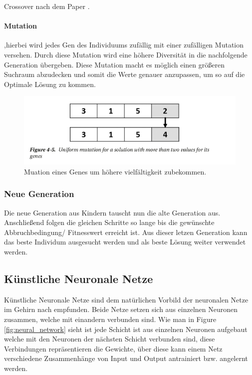 Crossover nach dem Paper \cite{Umbarkar2015}.




\paragraph{Mutation},hierbei wird jedes Gen des Individuums zufällig mit einer zufälligen Mutation versehen. Durch diese Mutation wird eine höhere Diversität in die nachfolgende Generation übergeben. Diese Mutation macht es möglich einen größeren Suchraum abzudecken und somit die Werte genauer anzupassen, um so auf die Optimale Lösung zu kommen. 

\begin{figure}[H]
  \centering  
  \includegraphics[scale=0.5]{img/mutation.png}
  \caption{Muation eines Genes um höhere vielfältigkeit zubekommen.\cite{Rashid2017} }
  \label{fig:chromoson_mutation}
\end{figure}


\subsubsection{Neue Generation}
Die neue Generation aus Kindern tauscht nun die alte Generation aus. Anschließend folgen die gleichen Schritte so lange bis die gewünschte Abbruchbedingung/ Fitnesswert erreicht ist. Aus dieser letzen Generation kann das beste Individum ausgesucht werden und als beste Lösung weiter verwendet werden. 

\newpage
\subsection{Künstliche Neuronale Netze}

Künstliche Neuronale Netze sind dem natürlichen Vorbild der neuronalen Netze im Gehirn nach empfunden. Beide Netze setzen sich aus einzelnen Neuronen zusammen, welche mit einandern verbunden sind. Wie man in Figure \ref{fig:neural_network} sieht ist jede Schicht ist aus einzelnen Neuronen aufgebaut welche mit den Neuronen der nächsten Schicht verbunden sind, diese Verbindungen repräsentieren die Gewichte, über diese kann einem Netz verschiedene Zusammenhänge von Input und Output antrainiert bzw. angelernt werden.

